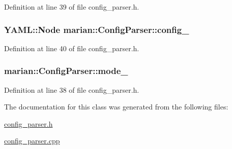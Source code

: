 Definition at line 39 of file config\+\_\+parser.\+h.

\subsubsection[{\texorpdfstring{config\+\_\+}{config_}}]{\setlength{\rightskip}{0pt plus 5cm}Y\+A\+M\+L\+::\+Node marian\+::\+Config\+Parser\+::config\+\_\+\hspace{0.3cm}{\ttfamily [private]}}\hypertarget{classmarian_1_1ConfigParser_a48aeae345c018ede7fb97d4705d5aeb1}{}\label{classmarian_1_1ConfigParser_a48aeae345c018ede7fb97d4705d5aeb1}


Definition at line 40 of file config\+\_\+parser.\+h.

\subsubsection[{\texorpdfstring{mode\+\_\+}{mode_}}]{ marian\+::\+Config\+Parser\+::mode\+\_\+\hspace{0.3cm}{\ttfamily [private]}}\hypertarget{classmarian_1_1ConfigParser_ae3bb2ffc2601222cc53734a60ab1f980}{}\label{classmarian_1_1ConfigParser_ae3bb2ffc2601222cc53734a60ab1f980}


Definition at line 38 of file config\+\_\+parser.\+h.



The documentation for this class was generated from the following files\+:\begin{DoxyCompactItemize}
\item 
\hyperlink{config__parser_8h}{config\+\_\+parser.\+h}\item 
\hyperlink{config__parser_8cpp}{config\+\_\+parser.\+cpp}\end{DoxyCompactItemize}
